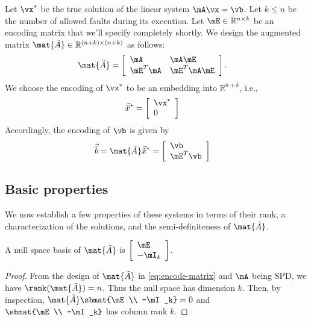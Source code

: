 \documentclass[11pt]{article}
\newcommand{\Tr}{{T}}
\newcommand{\tA}{\mat{\tilde{A}}}
\newcommand{\tb}{\vec{\tilde{b}}}
\newcommand{\tx}{\vec{\tilde{x}}}
\begin{document}
Let $\vx^\ast$ be the true solution of the linear system $ \mA \vx = \vb$.
Let $k\leq n$ be the number of allowed faults during its execution.
Let $\mE\in\mathbb{R}^{n\times k}$ be an encoding matrix that we'll
specify completely shortly. We design the augmented matrix
$\tA\in\mathbb{R}^{(n+k)\times (n+k)}$
as follows:
\begin{align}
\tA &= \left[\begin{array}{ll}
\mA & \mA \mE\\
\mE^{\Tr} \mA & \mE^{\Tr} \mA \mE
\end{array}\right].
\label{eq:encode-matrix}
\end{align}
We choose the encoding of $\vx^\ast$ to be an embedding into $\mathbb{R}^{n+k}$, i.e.,
\begin{align}
\tx^{\ast}&=\left[\begin{array}{l}
\vx^{\ast}\\
0
\end{array}
\right]
\label{eq:encode-solution}
\end{align}
Accordingly, the encoding of $\vb$ is given by
\begin{align}
\tb &= \tA\tx^{\ast} = \left[\begin{array}{l}
\vb\\
\mE^{\Tr} \vb
\end{array}\right]
\end{align}

\subsection{Basic properties}

We now establish a few properties of these systems in terms of their rank,
a characterization of the solutions, and the semi-definiteness of $\tA$.

\begin{proposition} A null space basis of $\tA$ is $\left[\begin{array}{l}\mE\\ -\mI_{k}\end{array}\right]$.
\label{prop:null-space-basis}
\end{proposition}
\begin{proof}
From the design of $\tA$ in \eqref{eq:encode-matrix} and $\mA$ being SPD, we have $\rank(\tA)=n$. Thus the null space has dimension $k$. Then, by inspection, $\tA \sbmat{\mE \\ -\mI_k} = 0$ and $\sbmat{\mE \\ -\mI_k}$ has column rank $k$.
\end{proof}
\end{document}
